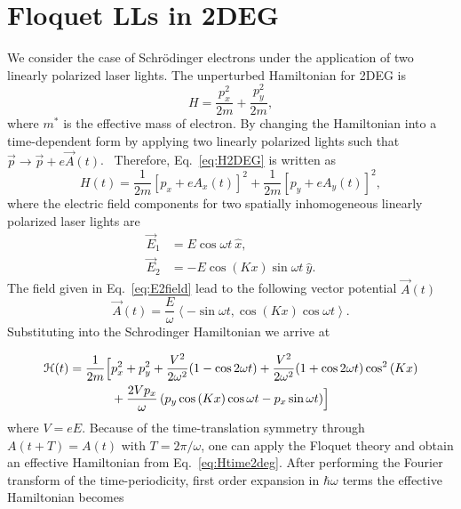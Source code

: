 \section{Floquet LLs in 2DEG}
We consider the case of Schr\"{o}dinger electrons under the application of two linearly polarized laser lights. The unperturbed Hamiltonian for 2DEG is%
\begin{equation}\label{eq:H2DEG}
H=\frac{p_{x}^{2}}{2m}+\frac{p_{y}^{2}}{2m},
\end{equation}
where $m^{\ast}$ is the effective mass of electron. By changing the Hamiltonian into a time-dependent form by applying two linearly polarized lights
such that $\vec{p}\rightarrow \vec{p}+e\vec{A}(t)$. \ Therefore, Eq.~\eqref{eq:H2DEG} is written as%
\begin{equation}\label{eq:H2time}
H(t)=\frac{1}{2m}[p_{x}+eA_{x}(t)]^{2}+\frac{1}{2m}[p_{y} +eA_{y}(t)]^{2},
\end{equation}
where the electric field components for two spatially inhomogeneous linearly polarized laser lights are
\begin{align} \label{eq:E2field}
  \vec{E}_{1} &= E \cos{\omega t}\ \hat{x}, \nonumber \\
  \vec{E}_{2} &= -E\cos{(K x)} \sin{\omega t}\ \hat{y}.
\end{align}%
The field given in Eq.~\eqref{eq:E2field} lead to the following vector potential $\vec{A}(t)$
\begin{equation}\label{eq:Avec2deg}
  \vec{A}(t)= \dfrac{E}{\omega} \left\langle -\sin \omega t, \cos{(Kx)} \cos{\omega t} \right\rangle.
\end{equation}%
Substituting into the Schrodinger Hamiltonian we arrive at

\begin{align}\label{eq:Htime2deg}
  \mathcal{H}(t) = \dfrac{1}{2m} \Bigl[ &p_x^2 + p_y^2 + \dfrac{V^2}{2\omega^2}(1-\cos{2\omega t}) + \dfrac{V^2}{2\omega^2}(1+\cos{2\omega t}) \cos^2{(Kx)} \nonumber \\
  &+\dfrac{2Vp_x}{\omega} \left(p_y \cos{(Kx)}\cos{\omega t} -  p_x \sin{\omega t}\right) \Bigr]
\end{align}
where $V=eE$.
Because of the time-translation symmetry through $A(t+T) = A(t)$ with $T = 2\pi/\omega$, one can apply the Floquet theory \cite{AEE, MBL, supp} and obtain an effective Hamiltonian from Eq.~\eqref{eq:Htime2deg}. After performing the Fourier transform of the time-periodicity, first order expansion in $\hbar \omega$ terms the effective Hamiltonian becomes

